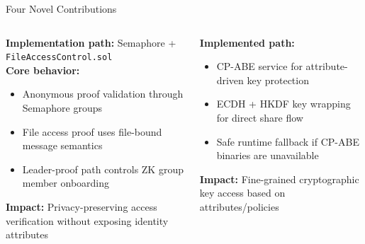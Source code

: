 \documentclass[aspectratio=169]{beamer}
\begin{document}
\begin{frame}{Four Novel Contributions}
\begin{columns}[T]
\begin{tcolorbox}[bluebox, title=\textbf{N1: Zero-Knowledge Proofs (ZKP)},
  height=5.8cm, valign=top]
\scriptsize
\textbf{Implementation path:} Semaphore + \texttt{FileAccessControl.sol}\\[5pt]
\textbf{Core behavior:}
\begin{itemize}
  \item Anonymous proof validation through Semaphore groups
  \item File access proof uses file-bound message semantics
  \item Leader-proof path controls ZK group member onboarding
\end{itemize}
\textbf{Impact:} Privacy-preserving access verification without exposing identity attributes
\end{tcolorbox}
\begin{tcolorbox}[greenbox, title=\textbf{N2: Attribute-Based Encryption (ABE)},
  height=5.8cm, valign=top]
\scriptsize
\textbf{Implemented path:}
\begin{itemize}
  \item CP-ABE service for attribute-driven key protection
  \item ECDH + HKDF key wrapping for direct share flow
  \item Safe runtime fallback if CP-ABE binaries are unavailable
\end{itemize}
\textbf{Impact:} Fine-grained cryptographic key access based on attributes/policies
\end{tcolorbox}
\end{columns}
\end{frame}
\end{document}

